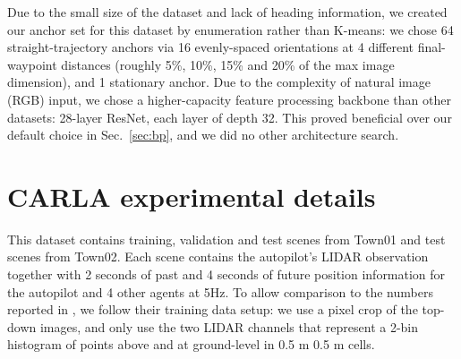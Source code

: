 \documentclass{article}
\begin{document}
Due to the small size of the dataset and lack of heading information, we created our anchor set for this dataset by enumeration rather than K-means: we chose 64 straight-trajectory anchors via 16 evenly-spaced orientations at 4 different final-waypoint distances (roughly 5\%, 10\%, 15\% and 20\% of the max image dimension), and 1 stationary anchor. Due to the complexity of natural image (RGB) input, we chose a higher-capacity feature processing backbone than other datasets: 28-layer ResNet, each layer of depth 32.  This proved beneficial over our default choice in Sec.~\ref{sec:bp}, and we did no other architecture search.


\section{CARLA experimental details}
\label{sec:carla_experiment_setup}

This dataset contains  training,  validation and  test scenes from Town01 and  test scenes from Town02. Each scene contains the autopilot's LIDAR observation together with 2 seconds of past and 4 seconds of future position information for the autopilot and 4 other agents at 5Hz. To allow comparison to the numbers reported in \cite{Rhinehart19}, we follow their training data setup: we use a  pixel crop of the top-down images, and only use the two LIDAR channels that represent a 2-bin histogram of points above and at ground-level in 0.5 m  0.5 m cells.  
 
\end{document}

